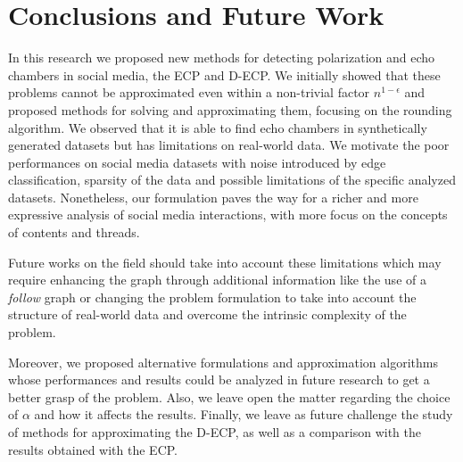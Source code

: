 \chapter{Conclusions and Future Work}
\label{ch:conclusionsAndFutureWork}

In this research we proposed new methods for detecting polarization and echo
chambers in social media, the \acrshort{ECP} and \acrshort{D-ECP}. We
initially showed that these problems cannot be approximated even within a
non-trivial factor $n^{1-\epsilon}$ and proposed methods for solving and
approximating them, focusing on the rounding algorithm. We observed that it is
able to find echo chambers in synthetically generated datasets but has limitations on
real-world data. We motivate the poor performances on social media datasets
with noise introduced by edge classification, sparsity of the data and
possible limitations of the specific analyzed datasets. Nonetheless, our formulation paves the way for a richer and more
expressive analysis of social media interactions, with more focus on the
concepts of contents and threads.

Future works on the field should take into account these limitations which
may require enhancing the graph through additional information like the use
of a \emph{follow} graph or
changing the problem formulation to take into account the structure
of real-world data and overcome the intrinsic complexity of the problem.

Moreover, we proposed alternative formulations and approximation algorithms
whose performances and results could be analyzed in future research to get a
better grasp of the problem. Also, we leave open the matter regarding the
choice of $\alpha$ and how it affects the results. Finally, we leave as future
challenge the study of methods for approximating the \acrshort{D-ECP}, as well
as a comparison with the results obtained with the \acrshort{ECP}.
